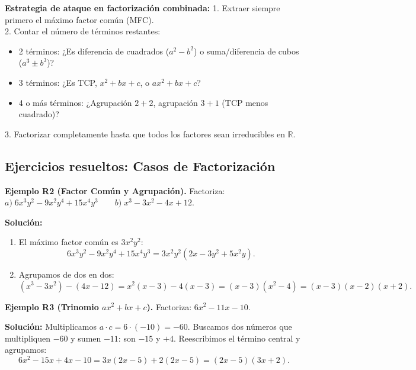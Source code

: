 \documentclass[12pt, letterpaper]{article}
\begin{document}
\begin{cuadroadvertencia}
      \textbf{Estrategia de ataque en factorización combinada:}
      1. Extraer siempre primero el máximo factor común (MFC). \\
      2. Contar el número de términos restantes:
      \begin{itemize}
            \item 2 términos: ¿Es diferencia de cuadrados ($a^2 - b^2$) o suma/diferencia de cubos ($a^3 \pm b^3$)?
            \item 3 términos: ¿Es TCP, $x^2 + bx + c$, o $ax^2 + bx + c$?
            \item 4 o más términos: ¿Agrupación $2+2$, agrupación $3+1$ (TCP menos cuadrado)?
      \end{itemize}
      3. Factorizar completamente hasta que todos los factores sean irreducibles en $\mathbb{R}$.
\end{cuadroadvertencia}

\subsection{Ejercicios resueltos: Casos de Factorización}

\textbf{Ejemplo R2 (Factor Común y Agrupación).} Factoriza: $a)\; 6x^3 y^2 - 9x^2 y^4 + 15x^4 y^3 \qquad b)\; x^3 - 3x^2 - 4x + 12$.

\begin{cuadrosolucion}
      \textbf{Solución:}
      \begin{enumerate}
            \item[a)] El máximo factor común es $3x^2 y^2$:
                  $$6x^3 y^2 - 9x^2 y^4 + 15x^4 y^3 = 3x^2 y^2(2x - 3y^2 + 5x^2 y).$$
            \item[b)] Agrupamos de dos en dos:
                  $$(x^3 - 3x^2) - (4x - 12) = x^2(x - 3) - 4(x - 3) = (x - 3)(x^2 - 4) = (x - 3)(x - 2)(x + 2).$$
      \end{enumerate}
\end{cuadrosolucion}

\textbf{Ejemplo R3 (Trinomio $ax^2 + bx + c$).} Factoriza: $6x^2 - 11x - 10$.

\begin{cuadrosolucion}
      \textbf{Solución:}
      Multiplicamos $a \cdot c = 6 \cdot (-10) = -60$. Buscamos dos números que multipliquen $-60$ y sumen $-11$: son $-15$ y $+4$.
      Reescribimos el término central y agrupamos:
      $$6x^2 - 15x + 4x - 10 = 3x(2x - 5) + 2(2x - 5) = (2x - 5)(3x + 2).$$
\end{cuadrosolucion}
\end{document}
